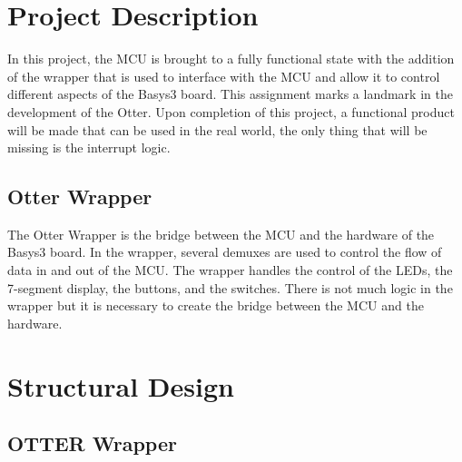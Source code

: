 \documentclass[
    a4paper, %
	12pt, %
    ]{CSSullivanBusinessReport}
\begin{document}
\newpage
\begin{fullwidth} %

\section{Project Description} %

In this project, the MCU is brought to a fully functional state with the addition of the wrapper that is used to interface with the MCU and allow it to control different aspects of the Basys3 board. This assignment marks a landmark in the development of the Otter. Upon completion of this project, a functional product will be made that can be used in the real world, the only thing that will be missing is the interrupt logic. 

\subsection{Otter Wrapper}
The Otter Wrapper is the bridge between the MCU and the hardware of the Basys3 board. In the wrapper, several demuxes are used to control the flow of data in and out of the MCU. The wrapper handles the control of the LEDs, the 7-segment display, the buttons, and the switches. There is not much logic in the wrapper but it is necessary to create the bridge between the MCU and the hardware.




\section{Structural Design} %

\subsection{OTTER Wrapper} %


\end{fullwidth}
\end{document}
